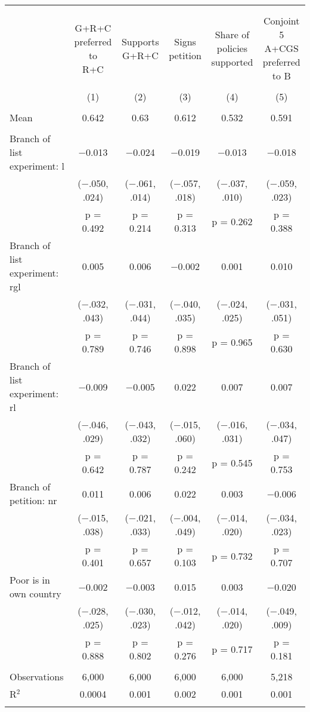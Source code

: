 
\begin{tabular}{@{\extracolsep{5pt}}lccccc} 
\\[-1.8ex]\hline 
\hline \\[-1.8ex] 
\\[-1.8ex] & \makecell{G+R+C\\preferred to\\R+C} & \makecell{Supports\\G+R+C} & \makecell{Signs\\petition} & \makecell{Share of\\policies\\supported} & \makecell{Conjoint 5\\A+CGS\\preferred to B} \\ 
\\[-1.8ex] & (1) & (2) & (3) & (4) & (5)\\ 
\hline \\[-1.8ex] 
Mean & 0.642 & 0.63 & 0.612 & 0.532 & 0.591  \\ \hline \\[-1.8ex]
 Branch of list experiment: l & $-$0.013 & $-$0.024 & $-$0.019 & $-$0.013 & $-$0.018 \\ 
  & ($-$.050, .024) & ($-$.061, .014) & ($-$.057, .018) & ($-$.037, .010) & ($-$.059, .023) \\ 
  & p = 0.492 & p = 0.214 & p = 0.313 & p = 0.262 & p = 0.388 \\ 
  Branch of list experiment: rgl & 0.005 & 0.006 & $-$0.002 & 0.001 & 0.010 \\ 
  & ($-$.032, .043) & ($-$.031, .044) & ($-$.040, .035) & ($-$.024, .025) & ($-$.031, .051) \\ 
  & p = 0.789 & p = 0.746 & p = 0.898 & p = 0.965 & p = 0.630 \\ 
  Branch of list experiment: rl & $-$0.009 & $-$0.005 & 0.022 & 0.007 & 0.007 \\ 
  & ($-$.046, .029) & ($-$.043, .032) & ($-$.015, .060) & ($-$.016, .031) & ($-$.034, .047) \\ 
  & p = 0.642 & p = 0.787 & p = 0.242 & p = 0.545 & p = 0.753 \\ 
  Branch of petition: nr & 0.011 & 0.006 & 0.022 & 0.003 & $-$0.006 \\ 
  & ($-$.015, .038) & ($-$.021, .033) & ($-$.004, .049) & ($-$.014, .020) & ($-$.034, .023) \\ 
  & p = 0.401 & p = 0.657 & p = 0.103 & p = 0.732 & p = 0.707 \\ 
  Poor is in own country & $-$0.002 & $-$0.003 & 0.015 & 0.003 & $-$0.020 \\ 
  & ($-$.028, .025) & ($-$.030, .023) & ($-$.012, .042) & ($-$.014, .020) & ($-$.049, .009) \\ 
  & p = 0.888 & p = 0.802 & p = 0.276 & p = 0.717 & p = 0.181 \\ 
 \hline \\[-1.8ex] 

Observations & 6,000 & 6,000 & 6,000 & 6,000 & 5,218 \\ 
R$^{2}$ & 0.0004 & 0.001 & 0.002 & 0.001 & 0.001 \\ 
\hline 
\hline \\[-1.8ex] 
\end{tabular} 